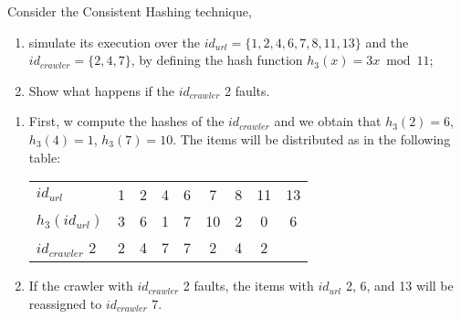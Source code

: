 \exercise

Consider the Consistent Hashing technique,
%
\begin{enumerate}

  \item simulate its execution over the $id_{url} = \{ 1, 2, 4, 6, 7, 8, 11,
  13 \}$ and the $id_{crawler} = \{ 2, 4, 7 \}$, by defining the hash function
  $h_3(x) = 3x \bmod 11$;

  \item Show what happens if the $id_{crawler}$ 2 faults.

\end{enumerate}

\solution

\begin{enumerate}

  \item First, w compute the hashes of the $id_{crawler}$ and we obtain that
  $h_3(2) = 6$, $h_3(4) = 1$, $h_3(7) = 10$. The items will be distributed as in
  the following table:
  \begin{table}[h]
    \centering
    \begin{tabular}{l|c|c|c|c|c|c|c|c}
      $id_{url}$      & 1 & 2 & 4 & 6 & 7 & 8 & 11 & 13 \\
      $h_3(id_{url})$ & 3 & 6 & 1 & 7 & 10 & 2 & 0 & 6 \\ \hline
      $id_{crawler}$  2 & 2 & 4 & 7 & 7 & 2 & 4 & 2 \\
    \end{tabular}
  \end{table}

  \item If the crawler with $id_{crawler}$ 2 faults, the items with $id_{url}$
  2, 6, and 13 will be reassigned to $id_{crawler}$ 7.

\end{enumerate}
